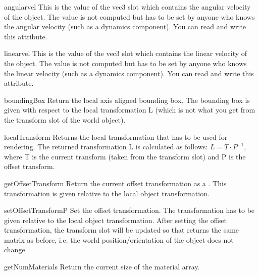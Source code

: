 \begin{memberdesc}{angularvel}
This is the value of the vec3 slot  which contains the 
angular velocity of the object. The value is not computed but has to be
set by anyone who knows the angular velocity (such as a dynamics component).
You can read and write this attribute.
\end{memberdesc}

\begin{memberdesc}{linearvel}
This is the value of the vec3 slot  which contains the 
linear velocity of the object. The value is not computed but has to be
set by anyone who knows the linear velocity (such as a dynamics component).
You can read and write this attribute.
\end{memberdesc}


\begin{methoddesc}{boundingBox}{}
Return the local axis aligned bounding box. The bounding box is
given with respect to the local transformation L (which is not
what you get from the transform slot of the world object).
\end{methoddesc}

\begin{methoddesc}{localTransform}{}
Returns the local transformation that has to be used for rendering.
The returned transformation L is calculated as follows: $L = T\cdot P^{-1}$,
where T is the current transform (taken from the transform slot)
and P is the offset transform.
\end{methoddesc}

\begin{methoddesc}{getOffsetTransform}{}
Return the current offset transformation as a . This
transformation is given relative to the local object transformation.
\end{methoddesc}

\begin{methoddesc}{setOffsetTransform}{P}
Set the offset transformation. The transformation has to be given
relative to the local object transformation. After setting the offset
transformation, the transform slot will be updated so that 
 returns the same matrix as before, i.e. the
world position/orientation of the object does not change.
\end{methoddesc}

\begin{methoddesc}{getNumMaterials}{}
Return the current size of the material array.
\end{methoddesc}


